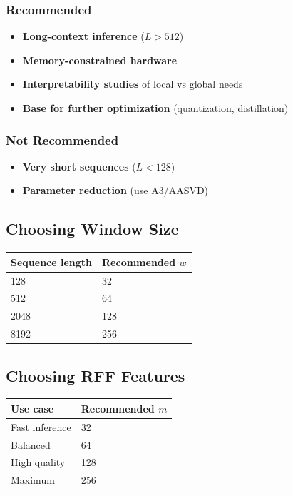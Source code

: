 \subsubsection{Recommended}

\begin{itemize}
\item \textbf{Long-context inference} ($L > 512$)
\item \textbf{Memory-constrained hardware}
\item \textbf{Interpretability studies} of local vs global needs
\item \textbf{Base for further optimization} (quantization, distillation)

\end{itemize}
\subsubsection{Not Recommended}

\begin{itemize}
\item \textbf{Very short sequences} ($L < 128$)
\item \textbf{Parameter reduction} (use A3/AASVD)

\end{itemize}
\subsection{Choosing Window Size}

\begin{table}[H]
\centering
\small
\begin{tabular}{ll}
\toprule
\textbf{Sequence length} & \textbf{Recommended $w$} \\
\midrule
128 & 32 \\
512 & 64 \\
2048 & 128 \\
8192 & 256 \\
\bottomrule
\end{tabular}
\end{table}

\subsection{Choosing RFF Features}

\begin{table}[H]
\centering
\small
\begin{tabular}{ll}
\toprule
\textbf{Use case} & \textbf{Recommended $m$} \\
\midrule
Fast inference & 32 \\
Balanced & 64 \\
High quality & 128 \\
Maximum & 256 \\
\bottomrule
\end{tabular}
\end{table}

